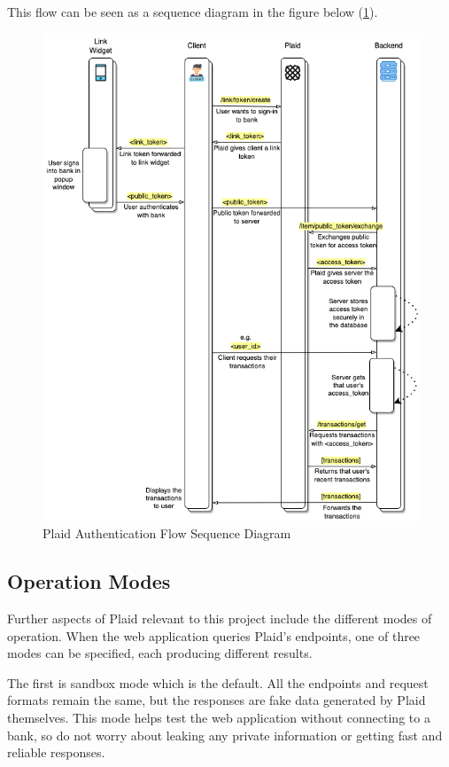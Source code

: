This flow can be seen as a sequence diagram in the figure below (\ref{fig:plaid_auth_flow}).

\begin{figure}[H]
    \centering
    \includegraphics[width=\textwidth]{images/auth_flow_sequence_diagram.png}
    \caption{Plaid Authentication Flow Sequence Diagram}
    \label{fig:plaid_auth_flow}
\end{figure}

\subsection{Operation Modes}
\label{sec:plaid-operation-modes}
Further aspects of Plaid relevant to this project include the different modes of operation. When the web application queries Plaid's endpoints, one of three modes can be specified, each producing different results.

The first is sandbox mode which is the default. All the endpoints and request formats remain the same, but the responses are fake data generated by Plaid themselves. This mode helps test the web application without connecting to a bank, so do not worry about leaking any private information or getting fast and reliable responses.

